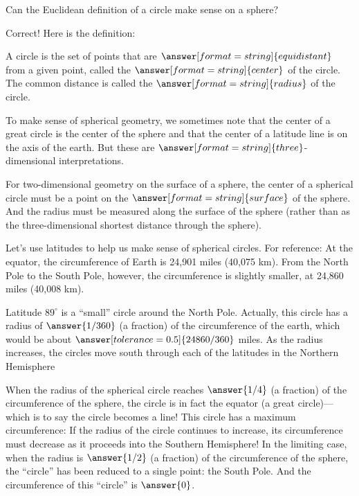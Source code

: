 \documentclass{ximera}
\begin{document}
\begin{problem}
Can the Euclidean definition of a circle make sense on a sphere?  
\begin{multipleChoice}
\end{multipleChoice}
\begin{problem}
Correct! Here is the definition:  

A circle is the set of points that are $\answer[format=string]{equidistant}$ from a given point, called the $\answer[format=string]{center}$ of the circle.  The common distance is called the $\answer[format=string]{radius}$ of the circle.  
\begin{problem}
To make sense of spherical geometry, we sometimes note that the center of a great circle is the center of the sphere and that the center of a latitude line is on the axis of the earth.  But these are $\answer[format=string]{three}$-dimensional interpretations. 

For two-dimensional geometry on the surface of a sphere, the center of a spherical circle must be a point on the $\answer[format=string]{surface}$ of the sphere.  And the radius must be measured along the surface of the sphere (rather than as the three-dimensional shortest distance through the sphere). 

Let's use latitudes to help us make sense of spherical circles.  For reference:  At the equator, the circumference of Earth is 24,901 miles (40,075 km). From the North Pole to the South Pole, however, the circumference is slightly smaller, at 24,860 miles (40,008 km).  

Latitude $89^\circ$ is a ``small'' circle around the North Pole.  Actually, this circle has a radius of $\answer{1/360}$ (a fraction) of the circumference of the earth, which would be about $\answer[tolerance=0.5]{24860/360}$ miles.  As the radius increases, the circles move south through each of the latitudes in the Northern Hemisphere

When the radius of the spherical circle reaches $\answer{1/4}$ (a fraction) of the circumference of the sphere, the circle is in fact the equator (a great circle)---which is to say the circle becomes a line!   This circle has a maximum circumference:  If the radius of the circle continues to increase, its circumference must decrease as it proceeds into the Southern Hemisphere!  In the limiting case, when the radius is $\answer{1/2}$ (a fraction) of the circumference of the sphere, the ``circle'' has been reduced to a single point:  the South Pole.  And the circumference of this ``circle'' is $\answer{0}$. 
\end{problem}
\end{problem}
\end{problem}
\end{document}
